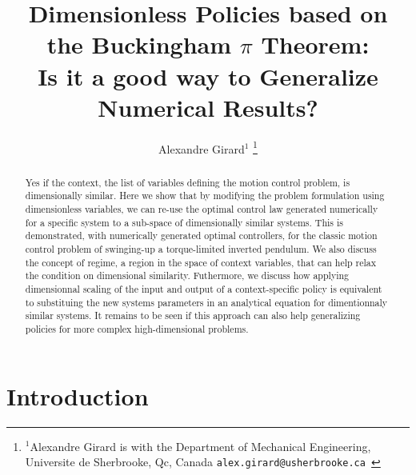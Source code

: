 

\title{\LARGE \bf
Dimensionless Policies based on the Buckingham $\pi$ Theorem: \\ 
Is it a good way to Generalize Numerical Results?
}


\author{Alexandre Girard$^{1}$%
\thanks{$^{1}$Alexandre Girard is with the Department of Mechanical Engineering, Universite de Sherbrooke, Qc, Canada {\tt\small  alex.girard@usherbrooke.ca }}%
}%


\maketitle
\thispagestyle{empty}
\pagestyle{empty}


\begin{abstract}
Yes if the context, the list of variables defining the motion control problem, is dimensionally similar. Here we show that by modifying the problem formulation using dimensionless variables, we can re-use the optimal control law generated numerically for a specific system to a sub-space of dimensionally similar systems. This is demonstrated, with numerically generated optimal controllers, for the classic motion control problem of swinging-up a torque-limited inverted pendulum. %
We also discuss the concept of regime, a region in the space of context variables, that can help relax the condition on dimensional similarity. Futhermore, we discuss how applying dimensionnal scaling of the input and output of a context-specific policy is equivalent to substituing the new systems parameters in an analytical equation for dimentionnaly similar systems. It remains to be seen if this approach can also help generalizing policies for more complex high-dimensional problems.
\end{abstract}

\section{Introduction}

